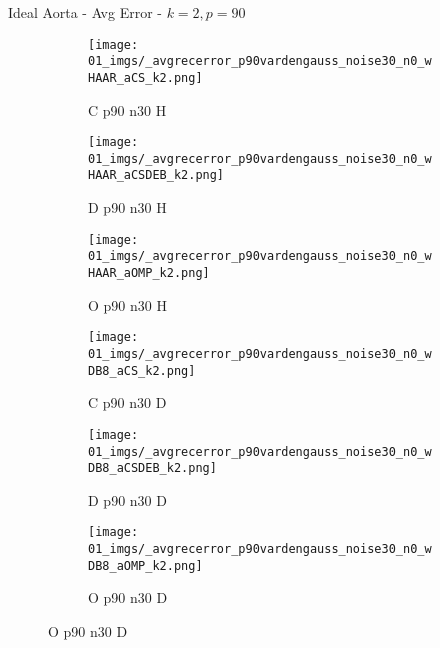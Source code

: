 \begin{frame}{Ideal Aorta - Avg Error - $k=2,p=90$}{}
\begin{figure}
\begin{subfigure}{0.13\textwidth}
\texttt{[image: 01\_imgs/\_avgrecerror\_p90vardengauss\_noise30\_n0\_wHAAR\_aCS\_k2.png]}
\caption*{\tiny C p90 n30 H}
\end{subfigure}
\begin{subfigure}{0.13\textwidth}
\texttt{[image: 01\_imgs/\_avgrecerror\_p90vardengauss\_noise30\_n0\_wHAAR\_aCSDEB\_k2.png]}
\caption*{\tiny D p90 n30 H}
\end{subfigure}
\begin{subfigure}{0.13\textwidth}
\texttt{[image: 01\_imgs/\_avgrecerror\_p90vardengauss\_noise30\_n0\_wHAAR\_aOMP\_k2.png]}
\caption*{\tiny O p90 n30 H}
\end{subfigure}
\begin{subfigure}{0.13\textwidth}
\texttt{[image: 01\_imgs/\_avgrecerror\_p90vardengauss\_noise30\_n0\_wDB8\_aCS\_k2.png]}
\caption*{\tiny C p90 n30 D}
\end{subfigure}
\begin{subfigure}{0.13\textwidth}
\texttt{[image: 01\_imgs/\_avgrecerror\_p90vardengauss\_noise30\_n0\_wDB8\_aCSDEB\_k2.png]}
\caption*{\tiny D p90 n30 D}
\end{subfigure}
\begin{subfigure}{0.13\textwidth}
\texttt{[image: 01\_imgs/\_avgrecerror\_p90vardengauss\_noise30\_n0\_wDB8\_aOMP\_k2.png]}
\caption*{\tiny O p90 n30 D}
\end{subfigure}
\end{figure}
\end{frame}


